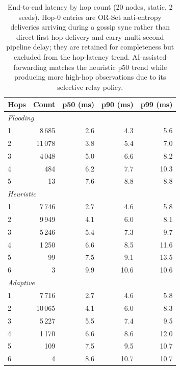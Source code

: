 \documentclass[conference]{IEEEtran}
\begin{document}
\begin{table}[!t]
  \centering
  \caption{End-to-end latency by hop count (20 nodes, static, 2 seeds).
           Hop-0 entries are OR-Set anti-entropy deliveries arriving
           during a gossip sync rather than direct first-hop delivery
           and carry multi-second pipeline delay; they are retained for
           completeness but excluded from the hop-latency trend.
           AI-assisted forwarding matches the heuristic p50 trend while
           producing more high-hop observations due to its selective relay policy.}
  \label{tab:hop_latency}
  \setlength{\tabcolsep}{4pt}
  \begin{tabular}{lrrrr}
    \toprule
    \textbf{Hops} & \textbf{Count} & \textbf{p50 (ms)} & \textbf{p90 (ms)} & \textbf{p99 (ms)} \\
    \midrule
    \multicolumn{5}{l}{\textit{Flooding}} \\
    1 &  8\,685 &   2.6  &   4.3  &     5.6    \\
    2 & 11\,078 &   3.8  &   5.4  &     7.0    \\
    3 &  4\,048 &   5.0  &   6.6  &     8.2    \\
    4 &    484 &   6.2  &   7.7  &    10.3    \\
    5 &     13 &   7.6  &   8.8  &     8.8    \\
    \midrule
    \multicolumn{5}{l}{\textit{Heuristic}} \\
    1 &  7\,746 &   2.7  &   4.6  &     5.8    \\
    2 &  9\,949 &   4.1  &   6.0  &     8.1    \\
    3 &  5\,246 &   5.4  &   7.3  &     9.7    \\
    4 &  1\,250 &   6.6  &   8.5  &    11.6    \\
    5 &     99 &   7.5  &   9.1  &    13.5    \\
    6 &      3 &   9.9  &  10.6  &    10.6    \\
    \midrule
    \multicolumn{5}{l}{\textit{Adaptive}} \\
    1 &  7\,716 &   2.7  &   4.6  &     5.8    \\
    2 & 10\,065 &   4.1  &   6.0  &     8.3    \\
    3 &  5\,227 &   5.5  &   7.4  &     9.5    \\
    4 &  1\,170 &   6.6  &   8.6  &    12.0    \\
    5 &    109 &   7.5  &   9.5  &    10.7    \\
    6 &      4 &   8.6  &  10.7  &    10.7    \\

\end{tabular}
\end{table}
\end{document}
